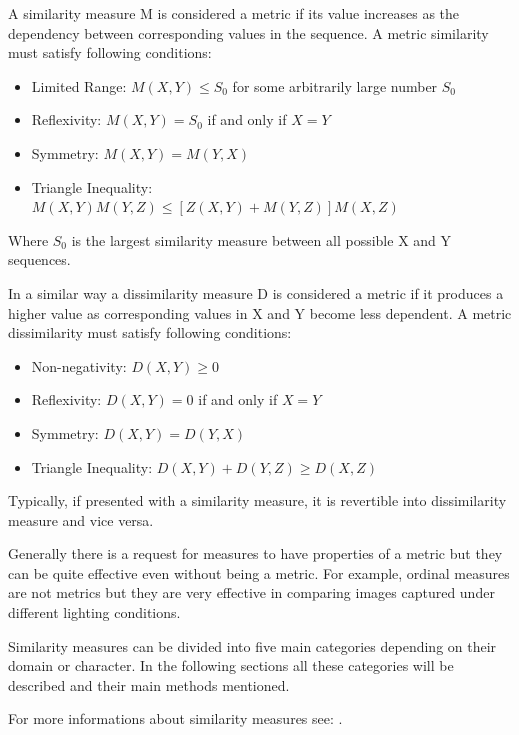 A similarity measure M is considered a metric if its value increases as the dependency between corresponding values in the sequence. A metric similarity must satisfy following conditions:
\begin{itemize}
\item Limited Range: $M(X,Y) \leq S_0$ for some arbitrarily large number $S_0$
\item Reflexivity: $M(X,Y) = S_0$ if and only if $X=Y$
\item Symmetry: $M(X,Y)=M(Y,X)$
\item Triangle Inequality: $M(X,Y)M(Y,Z)\leq [Z(X,Y)+M(Y,Z)]M(X,Z)$
\end{itemize}
Where $S_0$ is the largest similarity measure between all possible X and Y sequences.

In a similar way a dissimilarity measure D is considered a metric if it produces a higher value as corresponding values in X and Y become less dependent. A metric dissimilarity must satisfy following conditions:
\begin{itemize}
\item Non-negativity: $D(X,Y) \geq 0$
\item Reflexivity: $D(X,Y) = 0$ if and only if $X = Y$
\item Symmetry: $D(X,Y) = D(Y,X)$
\item Triangle Inequality: $D(X,Y) + D(Y,Z) \geq D(X,Z)$
\end{itemize}

Typically, if presented with a similarity measure, it is revertible into dissimilarity measure and vice versa.

Generally there is a request for measures to have properties of a metric but they can be quite effective even without being a metric. For example, ordinal measures are not metrics but they are very effective in comparing images captured under different lighting conditions.\cite{simMeasuresLecture}

Similarity measures can be divided into five main categories depending on their domain or character. In the following sections all these categories will be described and their main methods mentioned.

For more informations about similarity measures see: \cite{clusteringSimMeasure} \cite{simDissim} \cite{simMeasuresLecture}.

